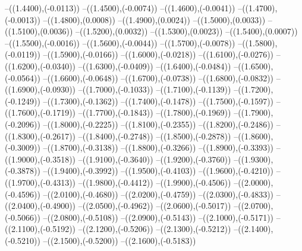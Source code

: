 {	--({\sx*(1.4400)},{\sy*(-0.0113)})
	--({\sx*(1.4500)},{\sy*(-0.0074)})
	--({\sx*(1.4600)},{\sy*(-0.0041)})
	--({\sx*(1.4700)},{\sy*(-0.0013)})
	--({\sx*(1.4800)},{\sy*(0.0008)})
	--({\sx*(1.4900)},{\sy*(0.0024)})
	--({\sx*(1.5000)},{\sy*(0.0033)})
	--({\sx*(1.5100)},{\sy*(0.0036)})
	--({\sx*(1.5200)},{\sy*(0.0032)})
	--({\sx*(1.5300)},{\sy*(0.0023)})
	--({\sx*(1.5400)},{\sy*(0.0007)})
	--({\sx*(1.5500)},{\sy*(-0.0016)})
	--({\sx*(1.5600)},{\sy*(-0.0044)})
	--({\sx*(1.5700)},{\sy*(-0.0078)})
	--({\sx*(1.5800)},{\sy*(-0.0119)})
	--({\sx*(1.5900)},{\sy*(-0.0166)})
	--({\sx*(1.6000)},{\sy*(-0.0218)})
	--({\sx*(1.6100)},{\sy*(-0.0276)})
	--({\sx*(1.6200)},{\sy*(-0.0340)})
	--({\sx*(1.6300)},{\sy*(-0.0409)})
	--({\sx*(1.6400)},{\sy*(-0.0484)})
	--({\sx*(1.6500)},{\sy*(-0.0564)})
	--({\sx*(1.6600)},{\sy*(-0.0648)})
	--({\sx*(1.6700)},{\sy*(-0.0738)})
	--({\sx*(1.6800)},{\sy*(-0.0832)})
	--({\sx*(1.6900)},{\sy*(-0.0930)})
	--({\sx*(1.7000)},{\sy*(-0.1033)})
	--({\sx*(1.7100)},{\sy*(-0.1139)})
	--({\sx*(1.7200)},{\sy*(-0.1249)})
	--({\sx*(1.7300)},{\sy*(-0.1362)})
	--({\sx*(1.7400)},{\sy*(-0.1478)})
	--({\sx*(1.7500)},{\sy*(-0.1597)})
	--({\sx*(1.7600)},{\sy*(-0.1719)})
	--({\sx*(1.7700)},{\sy*(-0.1843)})
	--({\sx*(1.7800)},{\sy*(-0.1969)})
	--({\sx*(1.7900)},{\sy*(-0.2096)})
	--({\sx*(1.8000)},{\sy*(-0.2225)})
	--({\sx*(1.8100)},{\sy*(-0.2355)})
	--({\sx*(1.8200)},{\sy*(-0.2486)})
	--({\sx*(1.8300)},{\sy*(-0.2617)})
	--({\sx*(1.8400)},{\sy*(-0.2748)})
	--({\sx*(1.8500)},{\sy*(-0.2878)})
	--({\sx*(1.8600)},{\sy*(-0.3009)})
	--({\sx*(1.8700)},{\sy*(-0.3138)})
	--({\sx*(1.8800)},{\sy*(-0.3266)})
	--({\sx*(1.8900)},{\sy*(-0.3393)})
	--({\sx*(1.9000)},{\sy*(-0.3518)})
	--({\sx*(1.9100)},{\sy*(-0.3640)})
	--({\sx*(1.9200)},{\sy*(-0.3760)})
	--({\sx*(1.9300)},{\sy*(-0.3878)})
	--({\sx*(1.9400)},{\sy*(-0.3992)})
	--({\sx*(1.9500)},{\sy*(-0.4103)})
	--({\sx*(1.9600)},{\sy*(-0.4210)})
	--({\sx*(1.9700)},{\sy*(-0.4313)})
	--({\sx*(1.9800)},{\sy*(-0.4412)})
	--({\sx*(1.9900)},{\sy*(-0.4506)})
	--({\sx*(2.0000)},{\sy*(-0.4596)})
	--({\sx*(2.0100)},{\sy*(-0.4680)})
	--({\sx*(2.0200)},{\sy*(-0.4759)})
	--({\sx*(2.0300)},{\sy*(-0.4833)})
	--({\sx*(2.0400)},{\sy*(-0.4900)})
	--({\sx*(2.0500)},{\sy*(-0.4962)})
	--({\sx*(2.0600)},{\sy*(-0.5017)})
	--({\sx*(2.0700)},{\sy*(-0.5066)})
	--({\sx*(2.0800)},{\sy*(-0.5108)})
	--({\sx*(2.0900)},{\sy*(-0.5143)})
	--({\sx*(2.1000)},{\sy*(-0.5171)})
	--({\sx*(2.1100)},{\sy*(-0.5192)})
	--({\sx*(2.1200)},{\sy*(-0.5206)})
	--({\sx*(2.1300)},{\sy*(-0.5212)})
	--({\sx*(2.1400)},{\sy*(-0.5210)})
	--({\sx*(2.1500)},{\sy*(-0.5200)})
	--({\sx*(2.1600)},{\sy*(-0.5183)})
}
